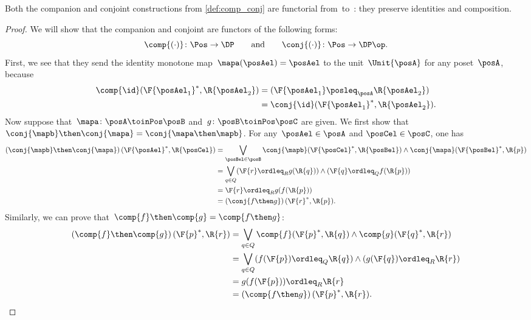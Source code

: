 \begin{lemma}
  \label{prop:comp_conj}
  Both the companion and conjoint constructions from \cref{def:comp_conj} are functorial from~\Pos to~\DP: they preserve identities and composition.
\end{lemma}
\begin{proof}
  We will show that the companion and conjoint are functors of the following forms:
  \begin{equation}
    \comp{(\cdot)}\colon\Pos\to\DP
    \qquad\text{and}\qquad
    \conj{(\cdot)}\colon\Pos\to\DP\op.
  \end{equation}
  First, we see that they send the identity monotone map~$\mapa(\posAel)=\posAel$ to the unit~$\Unit{\posA }$ for any poset~$\posA $, because
  \begin{equation}
    \begin{aligned}
      \comp{\id}(\F{\posAel_1}^*,\R{\posAel_2})&= (\F{\posAel_1} \posleq_{\posA} \R{\posAel_2})\\
      &=\conj{\id}(\F{\posAel_1}^*,\R{\posAel_2}).
    \end{aligned}
  \end{equation}
  Now suppose that~$\mapa\colon  \posA \toinPos \posB $ and~$g\colon \posB \toinPos \posC$ are given. We first show that $\conj{\mapb}\then\conj{\mapa}=\conj{\mapa\then \mapb}$.
  For any~$\posAel\in \posA$ and $\posCel\in \posC$, one has
  \begin{equation}
    \begin{aligned}
      \left(\conj{\mapb}\then \conj{\mapa}\right)(\F{\posAel}^*,\R{\posCel})
      &=\bigvee_{\posBel\in \posB} \conj{\mapb}(\F{\posCel}^*,\R{\posBel})\wedge\conj{\mapa}(\F{\posBel}^*,\R{p})\\
      &=\bigvee_{q\in Q} (\F{r}\ordleq_R g(\R{q})) \wedge (\F{q}\ordleq_Q f(\R{p})) \\
      &= \F{r}\ordleq_R g(f(\R{p}))\\
      &=\left(\conj{f\then g}\right)(\F{r}^*,\R{p}).
    \end{aligned}
  \end{equation}
  Similarly, we can prove that~$\comp{f}\then \comp{g}=\comp{f\then g}$:
  \begin{equation}
    \begin{aligned}
      \left(\comp{f}\then \comp{g}\right)(\F{p}^*,\R{r})&=\bigvee_{q\in Q} \comp{f}(\F{p}^*,\R{q})\wedge\comp{g}(\F{q}^*,\R{r})\\
      &=\bigvee_{q\in Q} (f(\F{p})\ordleq_Q \R{q})\wedge (g(\F{q})\ordleq_R \R{r})\\
      &=g(f(\F{p}))\ordleq_R \R{r}\\
      &=\left(\comp{f\then g}\right)(\F{p}^*,\R{r}).
    \end{aligned}
  \end{equation}
\end{proof}

